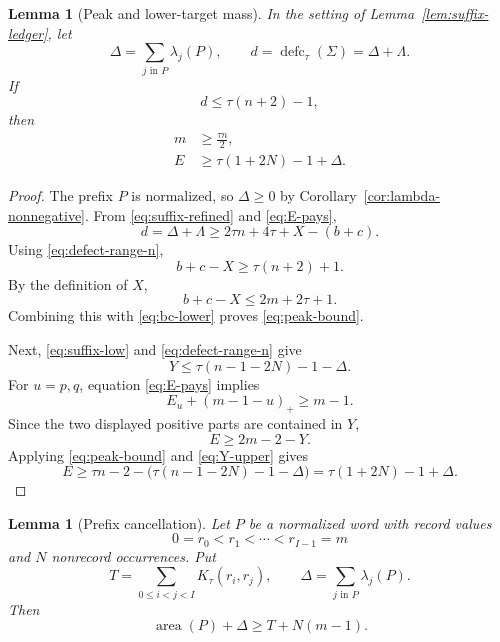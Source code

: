 \documentclass[11pt]{article}
\newtheorem{lemma}[theorem]{Lemma}
\theoremstyle{definition}
\theoremstyle{remark}
\newcommand{\area}{\operatorname{area}}
\newcommand{\defc}{\operatorname{defc}}
\begin{document}
\begin{lemma}[Peak and lower-target mass]
\label{lem:peak-and-E}
In the setting of Lemma~\ref{lem:suffix-ledger}, let
\[
  \Delta=\sum_{j\text{ in }P}\lambda_j(P),
  \qquad d=\defc_\tau(\Sigma)=\Delta+\Lambda.
\]
If
\begin{equation}
  d\le\tau(n+2)-1,
  \label{eq:defect-range-n}
\end{equation}
then
\begin{align}
  m&\ge\frac{\tau n}{2},
  \label{eq:peak-bound}\\
  E&\ge\tau(1+2N)-1+\Delta.
  \label{eq:E-bound}
\end{align}
\end{lemma}

\begin{proof}
The prefix \(P\) is normalized, so \(\Delta\ge0\) by
Corollary~\ref{cor:lambda-nonnegative}.  From
\eqref{eq:suffix-refined} and \eqref{eq:E-pays},
\[
  d=\Delta+\Lambda
  \ge2\tau n+4\tau+X-(b+c).
\]
Using \eqref{eq:defect-range-n},
\begin{equation}
  b+c-X\ge\tau(n+2)+1.
  \label{eq:bc-lower}
\end{equation}
By the definition of \(X\),
\[
  b+c-X\le2m+2\tau+1.
\]
Combining this with \eqref{eq:bc-lower} proves
\eqref{eq:peak-bound}.

Next, \eqref{eq:suffix-low} and \eqref{eq:defect-range-n} give
\begin{equation}
  Y\le\tau(n-1-2N)-1-\Delta.
  \label{eq:Y-upper}
\end{equation}
For \(u=p,q\), equation \eqref{eq:E-pays} implies
\[
  E_u+(m-1-u)_+\ge m-1.
\]
Since the two displayed positive parts are contained in \(Y\),
\[
  E\ge2m-2-Y.
\]
Applying \eqref{eq:peak-bound} and \eqref{eq:Y-upper} gives
\[
  E\ge\tau n-2-\bigl(\tau(n-1-2N)-1-\Delta\bigr)
   =\tau(1+2N)-1+\Delta.
\]
\end{proof}

\begin{lemma}[Prefix cancellation]
\label{lem:prefix-cancellation}
Let \(P\) be a normalized word with record values
\[
  0=r_0<r_1<\cdots<r_{I-1}=m
\]
and \(N\) nonrecord occurrences.  Put
\[
  T=\sum_{0\le i<j<I}K_\tau(r_i,r_j),
  \qquad
  \Delta=\sum_{j\text{ in }P}\lambda_j(P).
\]
Then
\begin{equation}
  \area(P)+\Delta\ge T+N(m-1).
  \label{eq:prefix-cancellation}
\end{equation}
\end{lemma}
\end{document}

